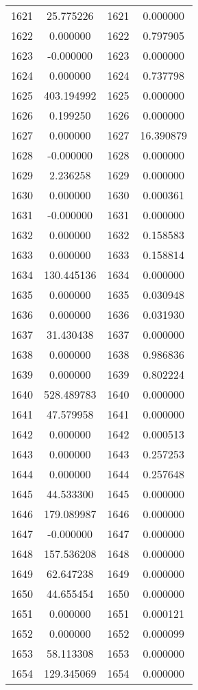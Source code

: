 \documentclass[12pt]{article}
\begin{document}
\begin{longtable}{@{}cccc@{}}
1621 & 25.775226 & 1621 & 0.000000 \\
1622 & 0.000000 & 1622 & 0.797905 \\
1623 & -0.000000 & 1623 & 0.000000 \\
1624 & 0.000000 & 1624 & 0.737798 \\
1625 & 403.194992 & 1625 & 0.000000 \\
1626 & 0.199250 & 1626 & 0.000000 \\
1627 & 0.000000 & 1627 & 16.390879 \\
1628 & -0.000000 & 1628 & 0.000000 \\
1629 & 2.236258 & 1629 & 0.000000 \\
1630 & 0.000000 & 1630 & 0.000361 \\
1631 & -0.000000 & 1631 & 0.000000 \\
1632 & 0.000000 & 1632 & 0.158583 \\
1633 & 0.000000 & 1633 & 0.158814 \\
1634 & 130.445136 & 1634 & 0.000000 \\
1635 & 0.000000 & 1635 & 0.030948 \\
1636 & 0.000000 & 1636 & 0.031930 \\
1637 & 31.430438 & 1637 & 0.000000 \\
1638 & 0.000000 & 1638 & 0.986836 \\
1639 & 0.000000 & 1639 & 0.802224 \\
1640 & 528.489783 & 1640 & 0.000000 \\
1641 & 47.579958 & 1641 & 0.000000 \\
1642 & 0.000000 & 1642 & 0.000513 \\
1643 & 0.000000 & 1643 & 0.257253 \\
1644 & 0.000000 & 1644 & 0.257648 \\
1645 & 44.533300 & 1645 & 0.000000 \\
1646 & 179.089987 & 1646 & 0.000000 \\
1647 & -0.000000 & 1647 & 0.000000 \\
1648 & 157.536208 & 1648 & 0.000000 \\
1649 & 62.647238 & 1649 & 0.000000 \\
1650 & 44.655454 & 1650 & 0.000000 \\
1651 & 0.000000 & 1651 & 0.000121 \\
1652 & 0.000000 & 1652 & 0.000099 \\
1653 & 58.113308 & 1653 & 0.000000 \\
1654 & 129.345069 & 1654 & 0.000000 \\

\end{longtable}
\end{document}
